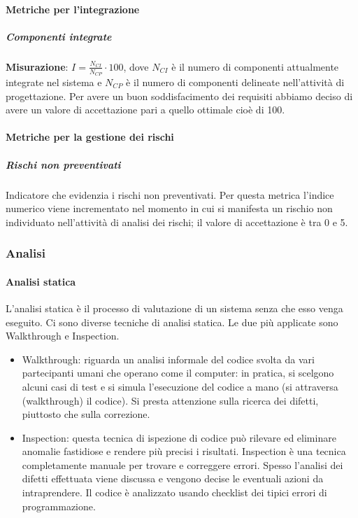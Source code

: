 \paragraph{Metriche per l'integrazione}
\subparagraph{Componenti integrate}
\textbf{Misurazione}: $I=\frac{N_{CI}}{N_{CP}} \cdot 100$, dove $N_{CI}$ è il numero di componenti attualmente integrate nel sistema e $N_{CP}$ è il numero di componenti delineate nell'attività di progettazione.
Per avere un buon soddisfacimento dei requisiti abbiamo deciso di avere un valore di accettazione pari a quello ottimale cioè di 100.

\paragraph{Metriche per la gestione dei rischi}

\subparagraph{Rischi non preventivati}
Indicatore che evidenzia i rischi non preventivati.
Per questa metrica l'indice numerico viene incrementato nel momento in cui si manifesta un rischio non individuato nell'attività di analisi dei rischi; il valore di accettazione è tra 0 e 5.

\subsubsection{Analisi}

\paragraph{Analisi statica}


L'analisi statica è il processo di valutazione di un sistema senza che esso venga eseguito. Ci sono diverse tecniche di analisi statica. Le due più applicate sono Walkthrough e Inspection.
\begin{itemize}
\item  Walkthrough: riguarda un analisi informale del codice svolta da vari partecipanti umani che operano come il computer: in pratica, si scelgono alcuni casi di test e si simula
l'esecuzione del codice a mano (si attraversa (walkthrough) il codice). Si presta attenzione sulla ricerca dei difetti, piuttosto che sulla correzione.

\item  Inspection: questa tecnica di ispezione di codice può rilevare
  ed eliminare anomalie fastidiose e rendere più precisi i
  risultati. Inspection è una tecnica completamente manuale per
  trovare e correggere errori. Spesso l'analisi dei difetti effettuata
  viene discussa e vengono decise le eventuali azioni da
  intraprendere. Il codice è analizzato usando checklist dei tipici
  errori di programmazione.  
\end{itemize}

